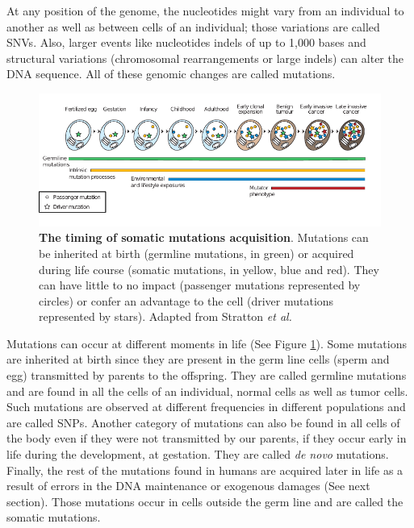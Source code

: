 At any position of the genome, the nucleotides might vary from an individual to another as well as between cells of an individual; those variations are called \gls{SNVs}. Also, larger events like nucleotides \gls{indels} of up to 1,000 bases and structural variations (chromosomal rearrangements or large \gls{indels}) can alter the \gls*{DNA} sequence. All of these genomic changes are called mutations.
\begin{figure}[H]
    \centering
    \includegraphics[width=1\textwidth]{Figures/Intro/Fig_mutation_over_life.pdf}
    \caption[The timing of somatic mutations acquisition]{\textbf{The timing of somatic mutations acquisition}. Mutations can be inherited at birth (germline mutations, in green) or acquired during life course (somatic mutations, in yellow, blue and red). They can have little to no impact (passenger mutations represented by circles) or confer an advantage to the cell (driver mutations represented by stars). Adapted from Stratton \textit{et al. } \cite{Stratton2009}}
    \label{fig:intro_fig3}
\end{figure}
Mutations can occur at different moments in life (See Figure \ref{fig:intro_fig3}). Some mutations are inherited at birth since they are present in the germ line cells (sperm and egg) transmitted by parents to the offspring. They are called germline mutations and are found in all the cells of an individual, normal cells as well as tumor cells. 
Such mutations are observed at different frequencies in different populations and are called \gls{SNP}s. %
Another category of mutations can also be found in all cells of the body even if they were not transmitted by our parents, if they occur early in life during the development, at gestation. They are called \textit{de novo} mutations. Finally, the rest of the mutations found in humans are acquired later in life as a result of errors in the \gls*{DNA} maintenance or exogenous damages (See next section). Those mutations occur in cells outside the germ line and are called the somatic mutations. 

